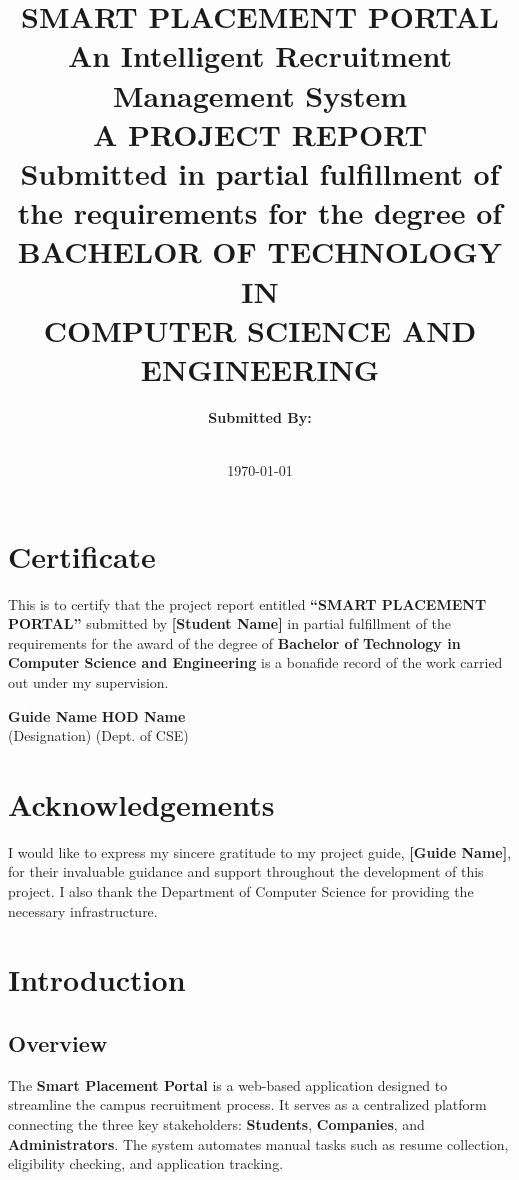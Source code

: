 \documentclass[12pt, a4paper]{report}
\title{
    \textbf{SMART PLACEMENT PORTAL} \\
    \large An Intelligent Recruitment Management System \\
    \vspace{1cm}
    \textbf{A PROJECT REPORT} \\
    \vspace{0.5cm}
    \large Submitted in partial fulfillment of the requirements for the degree of \\
    \textbf{BACHELOR OF TECHNOLOGY} \\
    \vspace{0.5cm}
    \large IN \\
    \textbf{COMPUTER SCIENCE AND ENGINEERING}
}
\author{\textbf{Submitted By:} \\ [Student Name] \\ [Roll Number]}
\date{\today}
\begin{document}
\maketitle

\chapter*{Certificate}
This is to certify that the project report entitled \textbf{``SMART PLACEMENT PORTAL''} submitted by \textbf{[Student Name]} in partial fulfillment of the requirements for the award of the degree of \textbf{Bachelor of Technology in Computer Science and Engineering} is a bonafide record of the work carried out under my supervision.

\vspace{2cm}
\noindent
\textbf{Guide Name} \hfill \textbf{HOD Name} \\
(Designation) \hfill (Dept. of CSE)

\chapter*{Acknowledgements}
I would like to express my sincere gratitude to my project guide, \textbf{[Guide Name]}, for their invaluable guidance and support throughout the development of this project. I also thank the Department of Computer Science for providing the necessary infrastructure.

\tableofcontents
\listoffigures

\chapter{Introduction}

\section{Overview}
The \textbf{Smart Placement Portal} is a web-based application designed to streamline the campus recruitment process. It serves as a centralized platform connecting the three key stakeholders: \textbf{Students}, \textbf{Companies}, and \textbf{Administrators}. The system automates manual tasks such as resume collection, eligibility checking, and application tracking.
\end{document}
